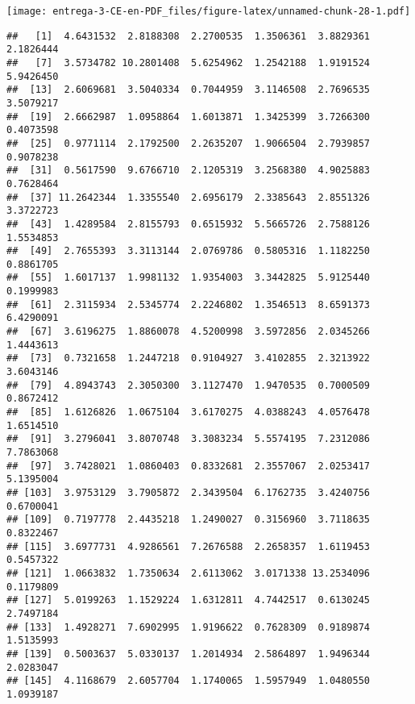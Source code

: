 \documentclass[
]{article}
\newenvironment{Shaded}{\begin{snugshade}}{\end{snugshade}}
\newcommand{\DataTypeTok}[1]{\textcolor[rgb]{0.13,0.29,0.53}{#1}}
\newcommand{\DecValTok}[1]{\textcolor[rgb]{0.00,0.00,0.81}{#1}}
\newcommand{\KeywordTok}[1]{\textcolor[rgb]{0.13,0.29,0.53}{\textbf{#1}}}
\newcommand{\NormalTok}[1]{#1}
\newcommand{\OperatorTok}[1]{\textcolor[rgb]{0.81,0.36,0.00}{\textbf{#1}}}
\newcommand{\StringTok}[1]{\textcolor[rgb]{0.31,0.60,0.02}{#1}}
\begin{document}
\texttt{[image: entrega-3-CE-en-PDF\_files/figure-latex/unnamed-chunk-28-1.pdf]}

\begin{Shaded}
\end{Shaded}

\begin{verbatim}
##   [1]  4.6431532  2.8188308  2.2700535  1.3506361  3.8829361  2.1826444
##   [7]  3.5734782 10.2801408  5.6254962  1.2542188  1.9191524  5.9426450
##  [13]  2.6069681  3.5040334  0.7044959  3.1146508  2.7696535  3.5079217
##  [19]  2.6662987  1.0958864  1.6013871  1.3425399  3.7266300  0.4073598
##  [25]  0.9771114  2.1792500  2.2635207  1.9066504  2.7939857  0.9078238
##  [31]  0.5617590  9.6766710  2.1205319  3.2568380  4.9025883  0.7628464
##  [37] 11.2642344  1.3355540  2.6956179  2.3385643  2.8551326  3.3722723
##  [43]  1.4289584  2.8155793  0.6515932  5.5665726  2.7588126  1.5534853
##  [49]  2.7655393  3.3113144  2.0769786  0.5805316  1.1182250  0.8861705
##  [55]  1.6017137  1.9981132  1.9354003  3.3442825  5.9125440  0.1999983
##  [61]  2.3115934  2.5345774  2.2246802  1.3546513  8.6591373  6.4290091
##  [67]  3.6196275  1.8860078  4.5200998  3.5972856  2.0345266  1.4443613
##  [73]  0.7321658  1.2447218  0.9104927  3.4102855  2.3213922  3.6043146
##  [79]  4.8943743  2.3050300  3.1127470  1.9470535  0.7000509  0.8672412
##  [85]  1.6126826  1.0675104  3.6170275  4.0388243  4.0576478  1.6514510
##  [91]  3.2796041  3.8070748  3.3083234  5.5574195  7.2312086  7.7863068
##  [97]  3.7428021  1.0860403  0.8332681  2.3557067  2.0253417  5.1395004
## [103]  3.9753129  3.7905872  2.3439504  6.1762735  3.4240756  0.6700041
## [109]  0.7197778  2.4435218  1.2490027  0.3156960  3.7118635  0.8322467
## [115]  3.6977731  4.9286561  7.2676588  2.2658357  1.6119453  0.5457322
## [121]  1.0663832  1.7350634  2.6113062  3.0171338 13.2534096  0.1179809
## [127]  5.0199263  1.1529224  1.6312811  4.7442517  0.6130245  2.7497184
## [133]  1.4928271  7.6902995  1.9196622  0.7628309  0.9189874  1.5135993
## [139]  0.5003637  5.0330137  1.2014934  2.5864897  1.9496344  2.0283047
## [145]  4.1168679  2.6057704  1.1740065  1.5957949  1.0480550  1.0939187

\end{verbatim}
\end{document}
